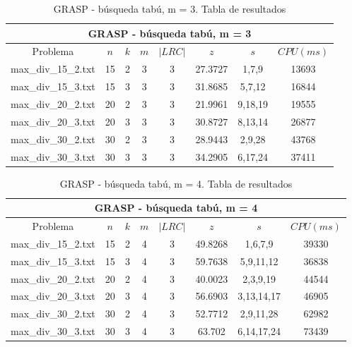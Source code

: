    \begin{table}[h]
   {\small
   \begin{center}
   \begin{tabular}{cccccccc}
      \multicolumn{8}{c}{GRASP - búsqueda tabú, m = 3} \\
      \hline
      Problema & $n$ & $k$ & $m$ & $|LRC|$ & $z$ & $s$ & $CPU(ms)$ \\
      \hline
      max\_div\_15\_2.txt & 15 & 2 & 3 & 3 & 27.3727 & 1,7,9 & 13693 \\
      max\_div\_15\_3.txt & 15 & 3 & 3 & 3 & 31.8685 & 5,7,12 & 16844 \\
      max\_div\_20\_2.txt & 20 & 2 & 3 & 3 & 21.9961 & 9,18,19 & 19555 \\
      max\_div\_20\_3.txt & 20 & 3 & 3 & 3 & 30.8727 & 8,13,14 & 26877 \\
      max\_div\_30\_2.txt & 30 & 2 & 3 & 3 & 28.9443 & 2,9,28 & 43768 \\
      max\_div\_30\_3.txt & 30 & 3 & 3 & 3 & 34.2905 & 6,17,24 & 37411 \\
      \hline
   \end{tabular}
   \end{center}
   }
   \caption{GRASP - búsqueda tabú, m = 3. Tabla de resultados}
   \end{table}

   \begin{table}[h]
   {\small
   \begin{center}
   \begin{tabular}{cccccccc}
      \multicolumn{8}{c}{GRASP - búsqueda tabú, m = 4} \\
      \hline
      Problema & $n$ & $k$ & $m$ & $|LRC|$ & $z$ & $s$ & $CPU(ms)$ \\
      \hline
      max\_div\_15\_2.txt & 15 & 2 & 4 & 3 & 49.8268 & 1,6,7,9 & 39330 \\
      max\_div\_15\_3.txt & 15 & 3 & 4 & 3 & 59.7638 & 5,9,11,12 & 36838 \\
      max\_div\_20\_2.txt & 20 & 2 & 4 & 3 & 40.0023 & 2,3,9,19 & 44544 \\
      max\_div\_20\_3.txt & 20 & 3 & 4 & 3 & 56.6903 & 3,13,14,17 & 46905 \\
      max\_div\_30\_2.txt & 30 & 2 & 4 & 3 & 52.7712 & 2,9,11,28 & 62982 \\
      max\_div\_30\_3.txt & 30 & 3 & 4 & 3 & 63.702 & 6,14,17,24 & 73439 \\
      \hline
   \end{tabular}
   \end{center}
   }
   \caption{GRASP - búsqueda tabú, m = 4. Tabla de resultados}
   \end{table}

